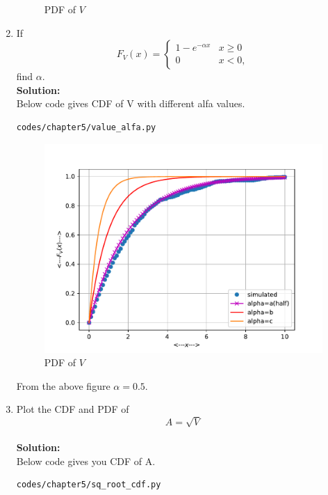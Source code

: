 \documentclass[journal,15pt,twocolumn]{IEEEtran}
\newcommand{\solution}{\noindent \textbf{Solution: }}
\begin{document}
\begin{enumerate}
\begin{figure}[H]
\caption{PDF of $V$}
\end{figure}
%
%
%
\item
If
%
\begin{equation}
F_{V}(x) = 
\begin{cases}
1 - e^{-\alpha x} & x \geq 0 \\
0 & x < 0,
\end{cases}
\end{equation}
%
find $\alpha$.\\
\solution \\
Below code gives CDF of V with different alfa values.
\begin{lstlisting}
codes/chapter5/value_alfa.py
\end{lstlisting}
\begin{figure}[H]
\centering
\includegraphics[width=\columnwidth]{./figs/chapter5/value_alfa.pdf}
\caption{PDF of $V$}
\end{figure}
From the above figure $\alpha = 0.5$.
%
\item
\label{ch3_raleigh_sim}
Plot the CDF and PDF of
%
\begin{equation}
A = \sqrt{V}
\end{equation}\\
\solution \\
Below code gives you CDF of A.
\begin{lstlisting}
codes/chapter5/sq_root_cdf.py
\end{lstlisting}


\end{enumerate}
\end{document}
